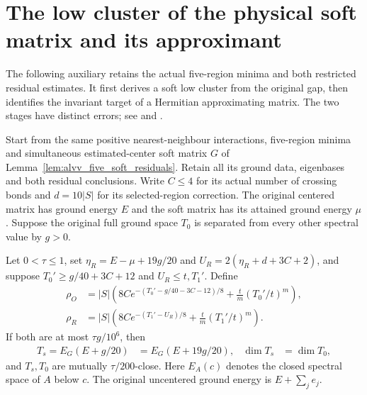 \section{The low cluster of the physical soft matrix and its approximant}

The following auxiliary retains the actual five-region minima and both
restricted residual estimates. It first derives a soft low cluster from
the original gap, then identifies the invariant target of a Hermitian
approximating matrix. The two stages have distinct errors; see
\cite[lines 1195--1255 and 1373--1420]{Arad2016RigorousRG} and
\cite{gap:alvv16_soft_regional_residuals,gap:alvv16_cluster_approximation}.

\begin{lemma}
    \label{lem:five_region_soft_and_hermitian_clusters}
    \leanok
    Start from the same positive nearest-neighbour interactions,
    five-region minima and simultaneous estimated-center soft matrix
    $G$ of Lemma~\ref{lem:alvv_five_soft_residuals}. Retain all its
    ground data, eigenbases and both residual conclusions. Write
    $C\le4$ for its actual number of crossing bonds and
    $d=10|S|$ for its selected-region correction. The original centered
    matrix has ground energy $E$ and the soft matrix has its attained
    ground energy $\mu$. Suppose the original full ground space $T_0$
    is separated from every other spectral value by $g>0$.

    Let $0<\tau\le1$, set
    $\eta_R=E-\mu+19g/20$ and
    $U_R=2(\eta_R+d+3C+2)$, and suppose
    $T_0'\ge g/40+3C+12$ and $U_R\le t,T_1'$.
    Define
    \begin{align}
        \rho_O & =|S|\left(8C e^{-(T_0'-g/40-3C-12)/8}
        +\frac{t}{m}(T_0'/t)^m\right),                 \\
        \rho_R & =|S|\left(8C e^{-(T_1'-U_R)/8}
        +\frac{t}{m}(T_1'/t)^m\right).
    \end{align}
    If both are at most $\tau g/10^6$, then
    \begin{align}
        T_s=E_G(E+g/20) & =E_G(E+19g/20),
                        & \dim T_s        & =\dim T_0,
    \end{align}
    and $T_s,T_0$ are mutually $\tau/200$-close. Here
    $E_A(c)$ denotes the closed spectral space of $A$ below $c$.
    The original uncentered ground energy is $E+\sum_j e_j$.


\end{lemma}
